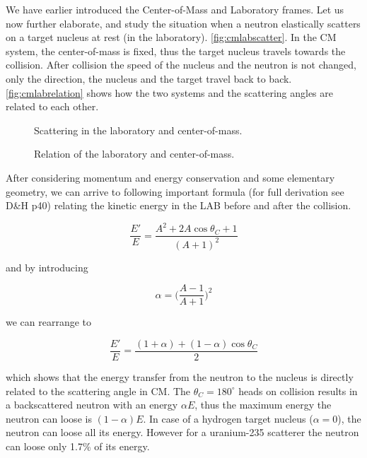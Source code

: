 We have earlier introduced the Center-of-Mass and Laboratory frames. Let us now further elaborate, and study the situation when a neutron elastically scatters on a target nucleus at rest (in the laboratory). \autoref{fig:cmlabscatter}. In the CM system, the center-of-mass is fixed, thus the target nucleus travels towards the collision. After collision the speed of the nucleus and the neutron is not changed, only the direction, the nucleus and the target travel back to back. \autoref{fig:cmlabrelation} shows how the two systems and the scattering angles are related to each other.

\begin{figure}[ht!]
\protect {}\protect
\caption{\label{fig:cmlabscatter} \footnotesize{Scattering in the laboratory and center-of-mass.}}
\end{figure}

\begin{figure}[ht!]
\protect {}\protect
\caption{\label{fig:cmlabrelation} \footnotesize{Relation of the laboratory and center-of-mass.}}
\end{figure}

After considering momentum and energy conservation and some elementary geometry, we can arrive to following important formula (for full derivation see D\&H p40) relating the kinetic energy in the LAB before and after the collision.

$$\frac{E'}{E}=\frac{A^2+2A\cos\theta_C+1}{(A+1)^2}$$

\noindent and by introducing 

$$\alpha=\Big(\frac{A-1}{A+1}\Big)^2$$

\noindent we can rearrange to

\begin{equation}\label{eq:muErelation}
\frac{E'}{E}=\frac{(1+\alpha)+(1-\alpha)\cos\theta_C}{2}
\end{equation}

\noindent which shows that the energy transfer from the neutron to the nucleus is directly related to the scattering angle in CM. The $\theta_C=180^\circ$ heads on collision results in a backscattered neutron with an energy $\alpha E$, thus the maximum energy the neutron can loose is $(1-\alpha)E$. In case of a hydrogen target nucleus ($\alpha=0$), the neutron can loose all its energy. However for a uranium-235 scatterer the neutron can loose only 1.7\% of its energy.

